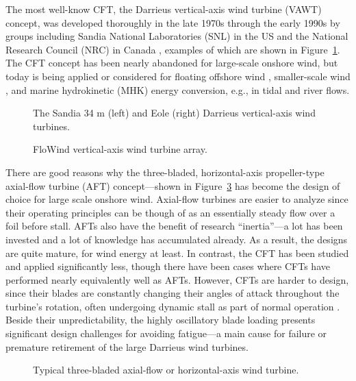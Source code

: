The most well-know CFT, the Darrieus vertical-axis wind turbine (VAWT) concept,
was developed thoroughly in the late 1970s through the early 1990s by groups
including Sandia National Laboratories (SNL) in the US and the National Research
Council (NRC) in Canada \cite{Para2002}, examples of which are shown in
Figure~\ref{fig:Darrieus}. The CFT concept has been nearly abandoned for
large-scale onshore wind, but today is being applied or considered for floating
offshore wind \cite{Sandia2012, Paulsen2011}, smaller-scale wind
\cite{Giges2012}, and marine hydrokinetic (MHK) energy conversion, e.g., in
tidal and river flows. 

\begin{figure}[ht]
    \caption{The Sandia 34 m (left) and Eole (right) Darrieus vertical-axis wind
        turbines.}
    
    \label{fig:Darrieus}
\end{figure}

\begin{figure}[ht]
    \caption{FloWind vertical-axis wind turbine array.}
    
    \label{fig:FloWind}
\end{figure}

There are good reasons why the three-bladed, horizontal-axis propeller-type
axial-flow turbine (AFT) concept---shown in Figure~\ref{fig:AFT} has become the
design of choice for large scale onshore wind. Axial-flow turbines are easier to
analyze since their operating principles can be though of as an essentially
steady flow over a foil before stall. AFTs also have the benefit of research
``inertia''---a lot has been invested and a lot of knowledge has accumulated
already. As a result, the designs are quite mature, for wind energy at least. In
contrast, the CFT has been studied and applied significantly less, though there
have been cases where CFTs have performed nearly equivalently well as AFTs.
However, CFTs are harder to design, since their blades are constantly changing
their angles of attack throughout the turbine's rotation, often undergoing
dynamic stall as part of normal operation \cite{Para2002}. Beside their
unpredictability, the highly oscillatory blade loading presents significant
design challenges for avoiding fatigue---a main cause for failure or premature
retirement of the large Darrieus wind turbines.

\begin{figure}[ht]
    \caption{Typical three-bladed axial-flow or horizontal-axis wind turbine.}
    
    \label{fig:AFT}
\end{figure}

